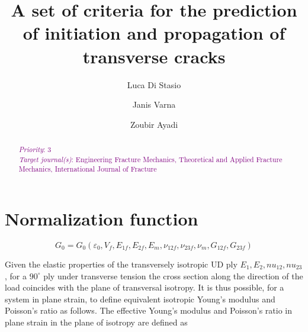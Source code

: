 \documentclass[review]{elsarticle}
\begin{document}
\begin{frontmatter}

\title{A set of criteria for the prediction of initiation and propagation of transverse cracks}


\author[nancy,lulea]{Luca Di Stasio}
\author[lulea]{Janis Varna}
\author[nancy]{Zoubir Ayadi}


\address[nancy]{Universit\'e de Lorraine, EEIGM, IJL, 6 Rue Bastien Lepage, F-54010 Nancy, France}
\address[lulea]{Lule\aa\ University of Technology, University Campus, SE-97187 Lule\aa, Sweden}

\begin{abstract}
\noindent
\textcolor{purple}{{\em Priority}: 3}\\
\textcolor{purple}{{\em Target journal(s)}: Engineering Fracture Mechanics, Theoretical and Applied Fracture Mechanics, International Journal of Fracture}\\
\end{abstract}


\end{frontmatter}

\linenumbers

\section{Normalization function}

\begin{equation}
G_{0}=G_{0}\left(\varepsilon_{0},V_{f},E_{1f},E_{2f},E_{m},\nu_{12f},\nu_{23f},\nu_{m},G_{12f},G_{23f}\right)
\end{equation}

Given the elastic properties of the transversely isotropic UD ply $E_{1},E_{2},nu_{12},nu_{23}$, for a $90^{\circ}$ ply under transverse tension the cross section along the direction of the load coincides with the plane of transversal isotropy. It is thus possible, for a system in plane strain, to define equivalent isotropic Young's modulus and Poisson's ratio as follows. The effective Young's modulus and Poisson's ratio in plane strain in the plane of isotropy are defined as
\end{document}
